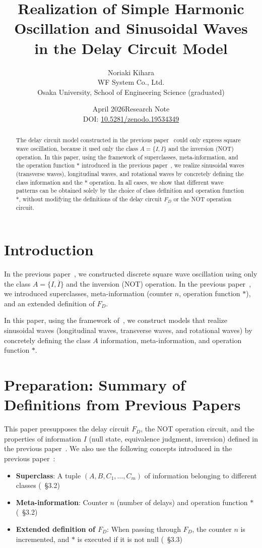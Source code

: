 \documentclass[12pt,a4paper]{article}
\title{Realization of Simple Harmonic Oscillation and Sinusoidal Waves\\
in the Delay Circuit Model}
\author{Noriaki Kihara\\
WF System Co., Ltd.\\
Osaka University, School of Engineering Science (graduated)}
\date{April 2026\quad Research Note\\[4pt]
DOI: \href{https://doi.org/10.5281/zenodo.19534349}{10.5281/zenodo.19534349}}
\begin{document}
\maketitle

\begin{abstract}
The delay circuit model constructed in the previous paper~\cite{ref1} could only express
square wave oscillation, because it used only the class $A = \{I, \overline{I}\}$ and the
inversion (NOT) operation. In this paper, using the framework of superclasses,
meta-information, and the operation function $*$ introduced in the previous paper~\cite{ref2},
we realize sinusoidal waves (transverse waves), longitudinal waves, and rotational waves by
concretely defining the class information and the $*$ operation. In all cases, we show that
different wave patterns can be obtained solely by the choice of class definition and operation
function $*$, without modifying the definitions of the delay circuit $F_D$ or the NOT operation
circuit.
\end{abstract}

\section{Introduction}

In the previous paper~\cite{ref1}, we constructed discrete square wave oscillation using only
the class $A = \{I, \overline{I}\}$ and the inversion (NOT) operation. In the previous
paper~\cite{ref2}, we introduced superclasses, meta-information (counter $n$, operation
function $*$), and an extended definition of $F_D$.

In this paper, using the framework of~\cite{ref2}, we construct models that realize sinusoidal
waves (longitudinal waves, transverse waves, and rotational waves) by concretely defining the
class $A$ information, meta-information, and operation function $*$.

\section{Preparation: Summary of Definitions from Previous Papers}

This paper presupposes the delay circuit $F_D$, the NOT operation circuit, and the properties
of information $I$ (null state, equivalence judgment, inversion) defined in the previous
paper~\cite{ref1}. We also use the following concepts introduced in the previous
paper~\cite{ref2}:

\begin{itemize}
  \item \textbf{Superclass}: A tuple $(A, B, C_1, \ldots, C_m)$ of information belonging to
        different classes (\cite{ref2}~\S3.2)
  \item \textbf{Meta-information}: Counter $n$ (number of delays) and operation function $*$
        (\cite{ref2}~\S3.2)
  \item \textbf{Extended definition of $F_D$}: When passing through $F_D$, the counter $n$ is
        incremented, and $*$ is executed if it is not $\mathrm{null}$ (\cite{ref2}~\S3.3)
\end{itemize}
\end{document}
